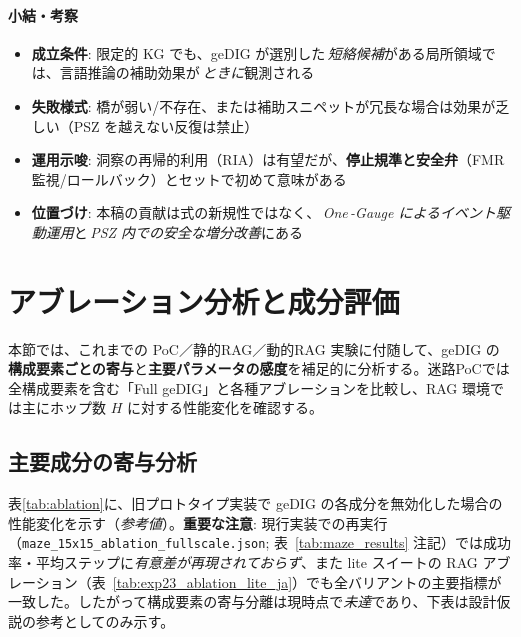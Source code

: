 \documentclass[ja=standard,xelatex]{bxjsarticle}
\begin{document}
\paragraph{小結・考察}
\begin{itemize}[leftmargin=*]
  \item \textbf{成立条件}: 限定的 KG でも、geDIG が選別した\,\emph{短絡候補}がある局所領域では、言語推論の補助効果が\,\emph{ときに}観測される
  \item \textbf{失敗様式}: 橋が弱い/不存在、または補助スニペットが冗長な場合は効果が乏しい（PSZ を越えない反復は禁止）
  \item \textbf{運用示唆}: 洞察の再帰的利用（RIA）は有望だが、\textbf{停止規準と安全弁}（FMR監視/ロールバック）とセットで初めて意味がある
  \item \textbf{位置づけ}: 本稿の貢献は式の新規性ではなく、\,\emph{One\,\mbox{-}Gauge によるイベント駆動運用}と\,\emph{PSZ 内での安全な増分改善}にある
\end{itemize}

\section{アブレーション分析と成分評価}
\label{sec:ablation_analysis}

本節では、これまでの PoC／静的RAG／動的RAG 実験に付随して、geDIG の\textbf{構成要素ごとの寄与}と\textbf{主要パラメータの感度}を補足的に分析する。迷路PoCでは全構成要素を含む「Full geDIG」と各種アブレーションを比較し、RAG 環境では主にホップ数 $H$ に対する性能変化を確認する。

\subsection{主要成分の寄与分析}

表\ref{tab:ablation}に、旧プロトタイプ実装で geDIG の各成分を無効化した場合の性能変化を示す（\emph{参考値}）。\textbf{重要な注意}: 現行実装での再実行（\texttt{maze\_15x15\_ablation\_fullscale.json}; 表~\ref{tab:maze_results} 注記）では成功率・平均ステップに\emph{有意差が再現されておらず}、また lite スイートの RAG アブレーション（表~\ref{tab:exp23_ablation_lite_ja}）でも全バリアントの主要指標が一致した。したがって構成要素の寄与分離は現時点で\emph{未達}であり、下表は設計仮説の参考としてのみ示す。
\end{document}

